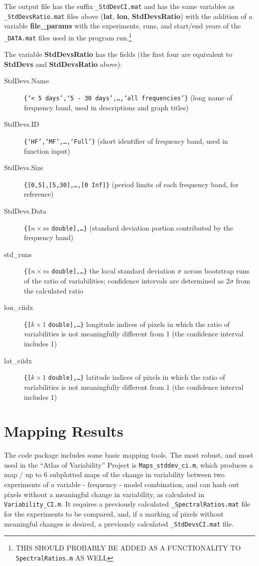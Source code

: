 \documentclass{article}
\begin{document}
The output file has the suffix \texttt{\_StdDevCI.mat} and has the same variables as \texttt{\_StdDevsRatio.mat} files above (\textbf{lat}, \textbf{lon}, \textbf{StdDevsRatio}) with the addition of a variable \textbf{file\_params} with the experiments, runs, and start/end years of the \texttt{\_DATA.mat} files used in the program run.\footnote{THIS SHOULD PROBABLY BE ADDED AS A FUNCTIONALITY TO \texttt{SpectralRatios.m} AS WELL}

The variable \textbf{StdDevsRatio} has the fields (the first four are equivalent to \textbf{StdDevs} and \textbf{StdDevsRatio} above):
\begin{description}
\item [StdDevs.Name] \texttt{\{`< 5 days',`5 - 30 days',\dots,`all frequencies'\}} (long name of frequency band, used in descriptions and graph titles)
\item [StdDevs.ID] \texttt{\{`HF',`MF',\dots,`Full'\}} (short identifier of frequency band, used in function input)
\item [StdDevs.Size] \texttt{\{[0,5],[5,30],\dots,[0 Inf]\}} (period limits of each frequency band, for reference)
\item [StdDevs.Data] \texttt{\{[}$n\times m$ \texttt{double],\dots\}} (standard deviation portion contributed by the frequency band)
\item [std\_runs] \texttt{\{[}$n\times m$ \texttt{double],\dots\}} the local standard deviation $\sigma$ across bootstrap runs of the ratio of variabilities; confidence intervals are determined as $2\sigma$ from the calculated ratio
\item [lon\_ciidx] \texttt{\{[}$k\times 1$ \texttt{double],\dots\}} longitude indices of pixels in which the ratio of variabilities is not meaningfully different from 1 (the confidence interval includes 1)
\item [lat\_ciidx] \texttt{\{[}$k\times 1$ \texttt{double],\dots\}} latitude indices of pixels in which the ratio of variabilities is not meaningfully different from 1 (the confidence interval includes 1)
\end{description}


\section{Mapping Results} %
\label{func:Maps_stddev_ci.m}
The code package includes some basic mapping tools. The most robust, and most used in the ``Atlas of Variability'' Project is \texttt{Maps\_stddev\_ci.m}, which produces a map / up to 6 subplotted maps of the change in variability between two experiments of a variable - frequency - model combination, and can hash out pixels without a meaningful change in variability, as calculated in \texttt{Variability\_CI.m}. It requires a previously calculated \texttt{\_SpectralRatios.mat} file for the experiments to be compared, and, if a marking of pixels without meaningful changes is desired, a previously calculated \texttt{\_StdDevsCI.mat} file.
\end{document}
